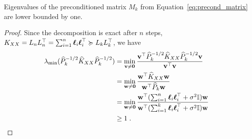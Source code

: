 \documentclass{article}
\begin{document}

\begin{proposition}\label{thm:pivchol_precond}
Eigenvalues of the preconditioned matrix $M_k$ from Equation~\eqref{eq:precond_matrix} are lower bounded by one. 
\end{proposition}

\begin{proof} %
Since the decomposition is exact after $n$ steps, $K_{XX} = L_nL_n^\top =\sum_{i=1}^n \boldsymbol{\mathbf{\ell}}_i\boldsymbol{\mathbf{\ell}}_i^\top \succcurlyeq L_kL_k^\top$, we have 
\begin{align*}
\lambda_{\min}( \widehat P_k^{-1/2} \widehat K_{XX} \widehat P_k^{-1/2} )
&= \min_{\vect v \neq \vect 0 } \frac{\vect v^\top \widehat P_k^{-1/2} \widehat K_{XX} \widehat P_k^{-1/2} \vect v}{ \vect v^\top \vect v} \\
&= \min_{\vect w \neq \vect 0} \frac{\vect w^\top \widehat K_{XX} \vect w}{\vect w^\top \widehat P_k \vect w} \\
&= \min_{\vect w \neq \vect 0} \frac{\vect w^\top (\sum_{i=1}^n \vect\ell_i \vect \ell_i^\top + \sigma^2 \Id) \vect w}{\vect w^\top (\sum_{i=1}^k \vect\ell_i \vect \ell_i^\top + \sigma^2 \Id) \vect w}\\
& \ge 1 \;.
\end{align*}

\end{proof}
\end{document}

